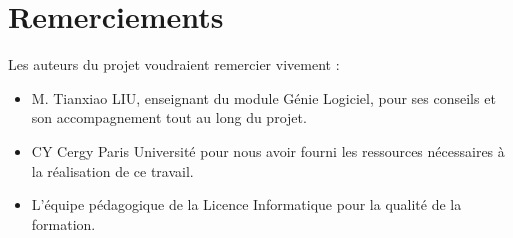 \documentclass[11pt, french]{article}
\begin{document}


\tableofcontents
\listoffigures
\listoftables


\newpage
\section* {Remerciements}
Les auteurs du projet voudraient remercier vivement :

\begin{itemize}
\item M. Tianxiao LIU, enseignant du module Génie Logiciel, pour ses conseils et son accompagnement tout au long du projet.
\item CY Cergy Paris Université pour nous avoir fourni les ressources nécessaires à la réalisation de ce travail.
\item L'équipe pédagogique de la Licence Informatique pour la qualité de la formation.
\end{itemize}








\newpage


\nocite{*}
\end{document}
